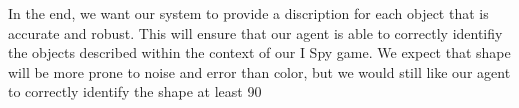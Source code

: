 \documentclass[11pt]{article}
\begin{document}
In the end, we want our system to provide a discription for each object that is accurate and robust. This will ensure that our agent is able to correctly identifiy the objects described within the context of our I Spy game. We expect that shape will be more prone to noise and error than color, but we would still like our agent to correctly identify the shape at least 90%



\end{document}
